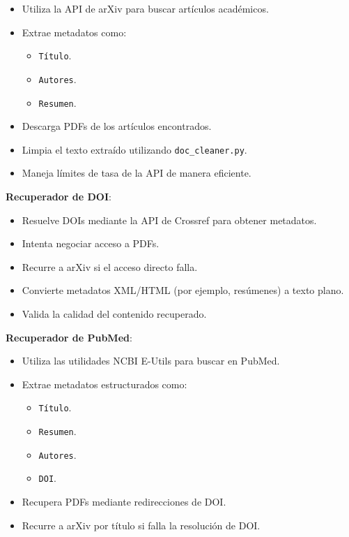 \documentclass[12pt]{article}
\begin{document}
    \begin{itemize}
        \item Utiliza la API de arXiv para buscar artículos académicos.
        \item Extrae metadatos como:
            \begin{itemize}
                \item \texttt{Título}.
                \item \texttt{Autores}.
                \item \texttt{Resumen}.
            \end{itemize}
        \item Descarga PDFs de los artículos encontrados.
        \item Limpia el texto extraído utilizando \texttt{doc\_cleaner.py}.
        \item Maneja límites de tasa de la API de manera eficiente.
    \end{itemize}

    
\textbf{Recuperador de DOI}:

    \begin{itemize}
        \item Resuelve DOIs mediante la API de Crossref para obtener metadatos.
        \item Intenta negociar acceso a PDFs.
        \item Recurre a arXiv si el acceso directo falla.
        \item Convierte metadatos XML/HTML (por ejemplo, resúmenes) a texto plano.
        \item Valida la calidad del contenido recuperado.
    \end{itemize}

    
\textbf{Recuperador de PubMed}:
    \begin{itemize}
        \item Utiliza las utilidades NCBI E-Utils para buscar en PubMed.
        \item Extrae metadatos estructurados como:
            \begin{itemize}
                \item \texttt{Título}.
                \item \texttt{Resumen}.
                \item \texttt{Autores}.
                \item \texttt{DOI}.
            \end{itemize}
        \item Recupera PDFs mediante redirecciones de DOI.
        \item Recurre a arXiv por título si falla la resolución de DOI.
    \end{itemize}
\end{document}
